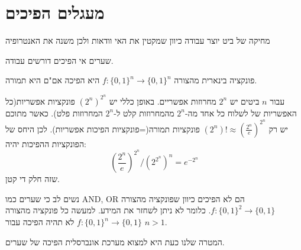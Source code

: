 \documentclass{tstextbook}
\begin{document}
\section{מעגלים הפיכים}

\begin{proposition}
מחיקה של ביט יוצר עבודה כיוון שמקטין את האי וודאות ולכן משנה את האנטרופיה

\end{proposition}
\begin{corollary}
שערים אי הפיכים דורשים עבודה.

\end{corollary}
\begin{proposition}
פונקציה בינארית מהצורה \(f:\{ 0,1 \}^{n}\to\{ 0,1 \}^{n}\) היא הפיכה אם"ם היא תמורה.

\end{proposition}
\begin{corollary}
עבור \(n\) ביטים יש \(2^{n}\) מחרוזות אפשריים.
באופן כללי יש \((2^{n})^{2^{n}}\) פונקציות אפשריות(כל האפשריות של לשלוח כל אחד מה-\(2^{n}\) מהמחרוזות קלט ל-\(2^{n}\) המחרוזות פלט). כאשר מתוכם יש רק \((2^{n})!\approx \left( \frac{2^{n}}{e} \right)^{2^{n}}\) פונקציות תמורה(=פונקציות הפיכות אפשריות). לכן היחס של הפונקציות ההפיכות יהיה:
$$\left({\frac{2^{n}}{e}}\right)^{2^{n}}/\left(2^{2^{n}}\right)^{n}=e^{-2^{n}}$$
שזה חלק די קטן.

\end{corollary}
\begin{remark}
נשים לב כי שערים כמו AND, OR הם לא הפיכים כיוון שפונקציה מהצורה \(f:\{ 0,1 \}^{2}\to\{ 0,1 \}\). כלומר לא ניתן לשחזר את המידע. למעשה כל פונקציה מהצורה \(f:\{ 0,1 \}^{n}\to \{ 0,1 \}\) לא תהיה הפיכה עבור \(n>1\).

\end{remark}
המטרה שלנו כעת היא למצוא מערכת אונברסלית הפיכה של שערים.
\end{document}
